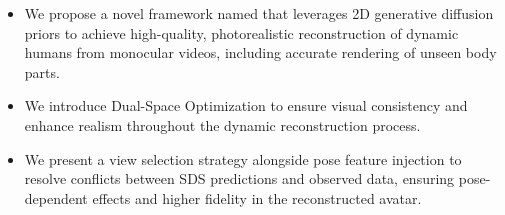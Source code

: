 \begin{itemize}

    \item 
    We propose a novel framework named \name that leverages 2D generative diffusion priors to achieve high-quality, photorealistic reconstruction of dynamic humans from monocular videos, including accurate rendering of unseen body parts. 
    \item 
    We introduce Dual-Space Optimization to ensure visual consistency and enhance realism throughout the dynamic reconstruction process.
    \item 
   We present a view selection strategy alongside pose feature injection to resolve conflicts between SDS predictions and observed data, ensuring pose-dependent effects and higher fidelity in the reconstructed avatar.
\end{itemize}

